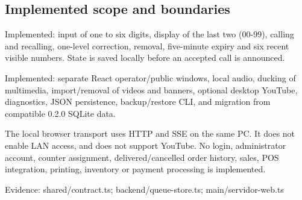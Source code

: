\subsection{Implemented scope and boundaries}

Implemented: input of one to six digits, display of the last two (00-99), calling and recalling, one-level correction, removal, five-minute expiry and six recent visible numbers. State is saved locally before an accepted call is announced.

Implemented: separate React operator/public windows, local audio, ducking of multimedia, import/removal of videos and banners, optional desktop YouTube, diagnostics, JSON persistence, backup/restore CLI, and migration from compatible 0.2.0 SQLite data.

The local browser transport uses HTTP and SSE on the same PC. It does not enable LAN access, and does not support YouTube. No login, administrator account, counter assignment, delivered/cancelled order history, sales, POS integration, printing, inventory or payment processing is implemented.

Evidence: shared/contract.ts; backend/queue-store.ts; main/servidor-web.ts
